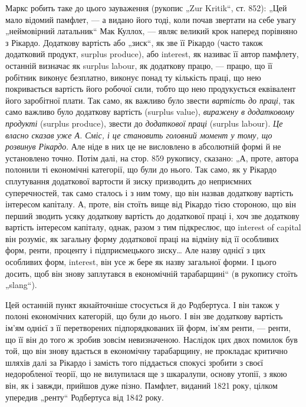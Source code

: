 Маркс робить таке до цього зауваження (рукопис „Zur Kritik“,
ст. 852): „Цей мало відомий памфлет, — а видано його тоді, коли почав
звертати на себе увагу „неймовірний латальник“ Мак Куллох, — являє
великий крок наперед порівняно з Рікардо. Додаткову вартість або
„зиск“, як зве її Рікардо (часто також додатковий продукт, surplus
produce), або interest, як називає її автор памфлету, останній визначає як
surplus labour, як додаткову працю, — працю, що її робітник виконує безплатно,
виконує понад ту кількість праці, що нею покривається вартість
його робочої сили, тобто що нею продукується еквівалент його заробітної
плати. Так само, як важливо було звести  \emph{вартість до праці}, так
само важливо було додаткову вартість (surplus value), \emph{виражену в додатковому
продукті} (surplus produce), звести до \emph{додаткової праці}
(surplus labour). \emph{Це власно сказав уже А. Сміс, і це становить головний
момент у тому, що розвинув Рікардо}. Але ніде в них це не
висловлено в абсолютній формі й не установлено точно. Потім далі, на
стор. 859 рукопису, сказано: „А, проте, автора полонили ті економічні
категорії, що були до нього. Так само, як у Рікардо сплутування додаткової
вартости й зиску призводить до неприємних суперечностей, так
само сталось і з ним тому, що він назвав додаткову вартість
інтересом капіталу. А, проте, він стоїть вище від Рікардо тією стороною, що
він перший зводить усяку додаткову вартість до додаткової праці і, хоч зве
додаткову вартість інтересом капіталу, однак, разом з тим підкреслює,
що interest of capital він розуміє, як загальну форму
додаткової праці на відміну від її особливих форм, ренти, проценту і
підприємецького зиску\dots{} Але назву однієї з цих особливих форм, interest,
він усе ж бере як назву загальної форми. І цього досить, щоб він знову
заплутався в економічній тарабарщині“ (в рукопису стоїть „slang“).

Цей останній пункт якнайточніше стосується й до Родбертуса. І він
також у полоні економічних категорій, що були до нього. І він зве
додаткову вартість ім’ям однієї з її перетворених підпорядкованих їй форм,
ім’ям ренти, — ренти, що її він до того ж зробив зовсім невизначеною.
Наслідок цих двох помилок був той, що він знову вдається в економічну
тарабарщину, не прокладає критично шляхів далі за Рікардо і замість
того піддається спокусі зробити з своєї недоробленої теорії, що не
вилупилася ще з шкаралупи, основу утопії, з якою він, як і завжди,
прийшов дуже пізно. Памфлет, виданий 1821 року, цілком упередив
„ренту“ Родбертуса від 1842 року.

